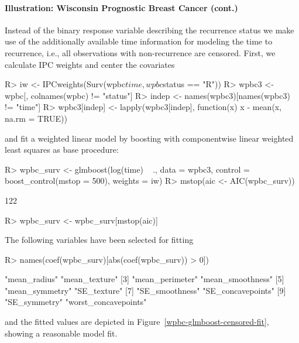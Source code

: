 \documentclass{article}
\newenvironment{Schunk}{}{}
\begin{document}
\paragraph{Illustration: Wisconsin Prognostic Breast Cancer (cont.)}         


Instead of the binary response variable describing the recurrence status we
make use of the additionally available time information for modeling
the time to recurrence, i.e., all observations with non-recurrence are censored.
First, we calculate IPC weights and center the covariates
\begin{Schunk}
\begin{Sinput}
R> iw <- IPCweights(Surv(wpbc$time, wpbc$status == 
         "R"))
R> wpbc3 <- wpbc[, colnames(wpbc) != "status"]
R> indep <- names(wpbc3)[names(wpbc3) != "time"]
R> wpbc3[indep] <- lapply(wpbc3[indep], function(x) x - 
         mean(x, na.rm = TRUE))
\end{Sinput}
\end{Schunk}
and fit a weighted linear model by boosting with componentwise linear
weighted least squares as base procedure: 
\begin{Schunk}
\begin{Sinput}
R> wpbc_surv <- glmboost(log(time) ~ ., data = wpbc3, 
         control = boost_control(mstop = 500), weights = iw)
R> mstop(aic <- AIC(wpbc_surv))
\end{Sinput}
\begin{Soutput}
[1] 122
\end{Soutput}
\begin{Sinput}
R> wpbc_surv <- wpbc_surv[mstop(aic)]
\end{Sinput}
\end{Schunk}
The following variables have been selected for fitting 
\begin{Schunk}
\begin{Sinput}
R> names(coef(wpbc_surv)[abs(coef(wpbc_surv)) > 0])
\end{Sinput}
\begin{Soutput}
 [1] "mean_radius"         "mean_texture"       
 [3] "mean_perimeter"      "mean_smoothness"    
 [5] "mean_symmetry"       "SE_texture"         
 [7] "SE_smoothness"       "SE_concavepoints"   
 [9] "SE_symmetry"         "worst_concavepoints"
\end{Soutput}
\end{Schunk}
and the fitted values are 
depicted in Figure~\ref{wpbc-glmboost-censored-fit}, showing a reasonable model fit.
\end{document}
